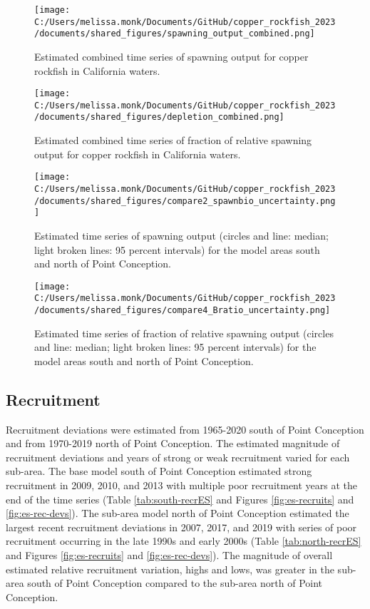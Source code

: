 \documentclass[11pt,
  english,
  letterpaper,
]{article}
\begin{document}
\begin{figure}
\centering
\texttt{[image: C:/Users/melissa.monk/Documents/GitHub/copper\_rockfish\_2023/documents/shared\_figures/spawning\_output\_combined.png]}
\caption{Estimated combined time series of spawning output for copper rockfish in California waters.\label{fig:es-sb-all}}
\end{figure}

\begin{figure}
\centering
\texttt{[image: C:/Users/melissa.monk/Documents/GitHub/copper\_rockfish\_2023/documents/shared\_figures/depletion\_combined.png]}
\caption{Estimated combined time series of fraction of relative spawning output for copper rockfish in California waters.\label{fig:es-depl-all}}
\end{figure}

\begin{figure}
\centering
\texttt{[image: C:/Users/melissa.monk/Documents/GitHub/copper\_rockfish\_2023/documents/shared\_figures/compare2\_spawnbio\_uncertainty.png]}
\caption{Estimated time series of spawning output (circles and line: median; light broken lines: 95 percent intervals) for the model areas south and north of Point Conception.\label{fig:es-sb}}
\end{figure}

\begin{figure}
\centering
\texttt{[image: C:/Users/melissa.monk/Documents/GitHub/copper\_rockfish\_2023/documents/shared\_figures/compare4\_Bratio\_uncertainty.png]}
\caption{Estimated time series of fraction of relative spawning output (circles and line: median; light broken lines: 95 percent intervals) for the model areas south and north of Point Conception.\label{fig:es-depl}}
\end{figure}

\pagebreak

\hypertarget{recruitment}{%
\subsection*{Recruitment}\label{recruitment}}

Recruitment deviations were estimated from 1965-2020 south of Point Conception and from 1970-2019 north of Point Conception. The estimated magnitude of recruitment deviations and years of strong or weak recruitment varied for each sub-area. The base model south of Point Conception estimated strong recruitment in 2009, 2010, and 2013 with multiple poor recruitment years at the end of the time series (Table \ref{tab:south-recrES} and Figures \ref{fig:es-recruits} and \ref{fig:es-rec-devs}). The sub-area model north of Point Conception estimated the largest recent recruitment deviations in 2007, 2017, and 2019 with series of poor recruitment occurring in the late 1990s and early 2000s (Table \ref{tab:north-recrES} and Figures \ref{fig:es-recruits} and \ref{fig:es-rec-devs}). The magnitude of overall estimated relative recruitment variation, highs and lows, was greater in the sub-area south of Point Conception compared to the sub-area north of Point Conception.
\end{document}
